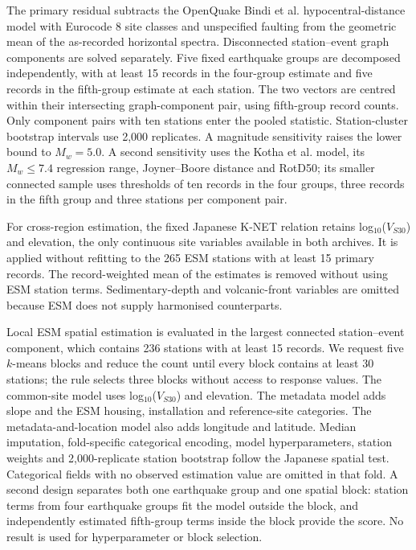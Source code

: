 \documentclass[10pt]{article}
\begin{document}
The primary residual subtracts the OpenQuake Bindi et al. hypocentral-distance model with Eurocode 8 site classes and unspecified faulting from the geometric mean of the as-recorded horizontal spectra. Disconnected station--event graph components are solved separately. Five fixed earthquake groups are decomposed independently, with at least 15 records in the four-group estimate and five records in the fifth-group estimate at each station. The two vectors are centred within their intersecting graph-component pair, using fifth-group record counts. Only component pairs with ten stations enter the pooled statistic. Station-cluster bootstrap intervals use 2,000 replicates. A magnitude sensitivity raises the lower bound to $M_w=5.0$. A second sensitivity uses the Kotha et al. model, its $M_w\leq7.4$ regression range, Joyner--Boore distance and RotD50\cite{kotha2020}; its smaller connected sample uses thresholds of ten records in the four groups, three records in the fifth group and three stations per component pair.

For cross-region estimation, the fixed Japanese K-NET relation retains log$_{10}$($V_{S30}$) and elevation, the only continuous site variables available in both archives. It is applied without refitting to the 265 ESM stations with at least 15 primary records. The record-weighted mean of the estimates is removed without using ESM station terms. Sedimentary-depth and volcanic-front variables are omitted because ESM does not supply harmonised counterparts.

Local ESM spatial estimation is evaluated in the largest connected station--event component, which contains 236 stations with at least 15 records. We request five $k$-means blocks and reduce the count until every block contains at least 30 stations; the rule selects three blocks without access to response values. The common-site model uses log$_{10}$($V_{S30}$) and elevation. The metadata model adds slope and the ESM housing, installation and reference-site categories. The metadata-and-location model also adds longitude and latitude. Median imputation, fold-specific categorical encoding, model hyperparameters, station weights and 2,000-replicate station bootstrap follow the Japanese spatial test. Categorical fields with no observed estimation value are omitted in that fold. A second design separates both one earthquake group and one spatial block: station terms from four earthquake groups fit the model outside the block, and independently estimated fifth-group terms inside the block provide the score. No result is used for hyperparameter or block selection.
\end{document}
